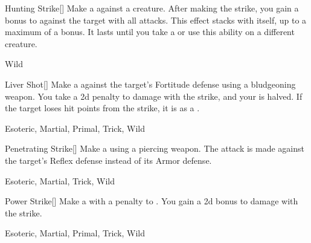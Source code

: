 \lowercase{\hypertarget{maneuver:Hunting Strike}{}}\label{maneuver:Hunting Strike}
\hypertarget{maneuver:Hunting Strike}{}
\begin{freeability}[Rank 1]{Hunting Strike}[]
Make a  against a creature.
After making the strike, you gain a  bonus to  against the target with all attacks.
This effect stacks with itself, up to a maximum of a  bonus.
It lasts until you take a  or use this ability on a different creature.


 Wild
\end{freeability}
\vspace{0.25em}



\lowercase{\hypertarget{maneuver:Liver Shot}{}}\label{maneuver:Liver Shot}
\hypertarget{maneuver:Liver Shot}{}
\begin{freeability}[Rank 1]{Liver Shot}[]
Make a  against the target's Fortitude defense using a bludgeoning weapon.
You take a \minus2d penalty to damage with the strike, and your  is halved.
If the target loses hit points from the strike, it is  as a .


 Esoteric, Martial, Primal, Trick, Wild
\end{freeability}
\vspace{0.25em}



\lowercase{\hypertarget{maneuver:Penetrating Strike}{}}\label{maneuver:Penetrating Strike}
\hypertarget{maneuver:Penetrating Strike}{}
\begin{freeability}[Rank 1]{Penetrating Strike}[]
Make a  using a piercing weapon.
The attack is made against the target's Reflex defense instead of its Armor defense.


 Esoteric, Martial, Trick, Wild
\end{freeability}
\vspace{0.25em}



\lowercase{\hypertarget{maneuver:Power Strike}{}}\label{maneuver:Power Strike}
\hypertarget{maneuver:Power Strike}{}
\begin{freeability}[Rank 1]{Power Strike}[]
Make a  with a  penalty to .
You gain a \plus2d bonus to damage with the strike.


 Esoteric, Martial, Primal, Trick, Wild
\end{freeability}
\vspace{0.25em}



